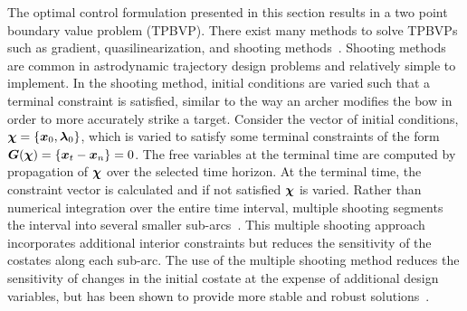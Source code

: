 \documentclass[smallcondensed]{svjour3}
\begin{document}
The optimal control formulation presented in this section results in a two point boundary value problem (TPBVP). 
There exist many methods to solve TPBVPs such as gradient, quasilinearization, and shooting methods~\cite{bryson1975,kirk2012}.
Shooting methods are common in astrodynamic trajectory design problems and relatively simple to implement.
In the shooting method, initial conditions are varied such that a terminal constraint is satisfied, similar to the way an archer modifies the bow in order to more accurately strike a target. 
Consider the vector of initial conditions, \( \bm{\chi} = \left\{ \bm{x}_0, \bm{\lambda}_0 \right\}\), which is varied to satisfy some terminal constraints of the form \( \bm{G}(\bm{\chi}) = \left\{ \bm{x}_t - \bm{x}_n \right\} = 0 \).
The free variables at the terminal time are computed by propagation of \( \bm{\chi} \) over the selected time horizon. 
At the terminal time, the constraint vector is calculated and if not satisfied \( \bm{\chi}\) is varied.
Rather than numerical integration over the entire time interval, multiple shooting segments the interval into several smaller sub-arcs~\cite{stoer2013}.
This multiple shooting approach incorporates additional interior constraints but reduces the sensitivity of the costates along each sub-arc.
The use of the multiple shooting method reduces the sensitivity of changes in the initial costate at the expense of additional design variables, but has been shown to provide more stable and robust solutions~\cite{ozimek2010a}.
\end{document}
